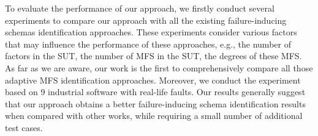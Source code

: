 \documentclass{sig-alternate-05-2015}
\begin{document}


To evaluate the performance of our approach, we firstly conduct several experiments to compare our approach with all the existing failure-inducing schemas identification approaches. These experiments consider various factors that may influence the performance of these approaches, e.g., the number of factors in the SUT, the number of MFS in the SUT, the degrees of these MFS. As far as we are aware, our work is the first to comprehensively compare all those adaptive MFS identification approaches. Moreover, we conduct the experiment based on 9 industrial software with real-life faults. Our results generally suggest that our approach obtains a better failure-inducing schema identification results when compared with other works, while requiring a small number of additional test cases.
\end{document}
